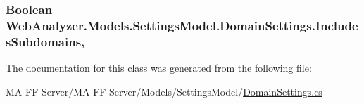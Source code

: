 \subsubsection[{Includes\+Subdomains}]{\setlength{\rightskip}{0pt plus 5cm}Boolean Web\+Analyzer.\+Models.\+Settings\+Model.\+Domain\+Settings.\+Includes\+Subdomains\hspace{0.3cm}{\ttfamily [get]}, {\ttfamily [set]}}\label{class_web_analyzer_1_1_models_1_1_settings_model_1_1_domain_settings_a55ea049e39a701dd4664daa1a53b1a92}


The documentation for this class was generated from the following file\+:\begin{DoxyCompactItemize}
\item 
M\+A-\/\+F\+F-\/\+Server/\+M\+A-\/\+F\+F-\/\+Server/\+Models/\+Settings\+Model/\hyperlink{_domain_settings_8cs}{Domain\+Settings.\+cs}\end{DoxyCompactItemize}
